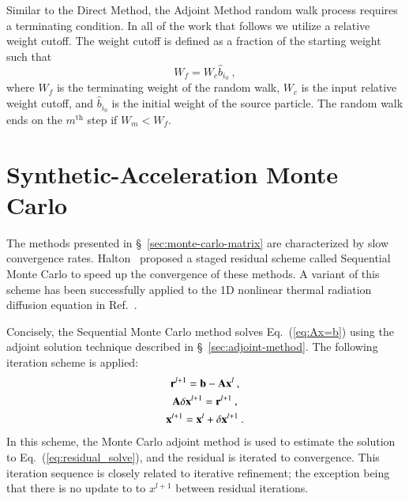 \documentclass[preprint,12pt]{elsarticle}
\newcommand{\vA}{\ensuremath{\ve{A}}}
\newcommand{\vb}{\ensuremath{\ve{b}}}
\newcommand{\vx}{\ensuremath{\ve{x}}}
\newcommand{\vr}{\ensuremath{\ve{r}}}
\begin{document}
Similar to the Direct Method, the Adjoint Method random walk process
requires a terminating condition.  In all of the work that follows we
utilize a relative weight cutoff.  The weight cutoff is defined as a
fraction of the starting weight such that
\begin{equation}
  W_f = W_c\hat{b}_{i_0}\:,
  \label{eq:weight_cutoff}
\end{equation}
where $W_f$ is the terminating weight of the random walk, $W_c$ is the
input relative weight cutoff, and $\hat{b}_{i_0}$ is the initial
weight of the source particle.  The random walk ends on the
$m^\text{th}$ step if $W_m < W_f$.

\section{Synthetic-Acceleration Monte Carlo}
\label{sec:iter-refin-monte}

The methods presented in \S~\ref{sec:monte-carlo-matrix} are
characterized by slow convergence rates.
Halton~\cite{halton_1962,halton_1994} proposed a staged residual
scheme called Sequential Monte Carlo to speed up the convergence of
these methods.  A variant of this scheme has been successfully applied
to the 1D nonlinear thermal radiation diffusion equation in
Ref.~\cite{evans_2003}.

Concisely, the Sequential Monte Carlo method solves
Eq.~(\ref{eq:Ax=b}) using the adjoint solution technique described in
\S~\ref{sec:adjoint-method}.  The following iteration scheme is
applied:
\begin{subequations}
  \begin{gather}
    \vr^{l+1} = \vb - \vA\vx^{l}\:, \\
    \vA\delta\vx^{l+1} = \vr^{l+1}\:, \label{eq:residual_solve}\\
    \vx^{l+1} = \vx^{l} + \delta\vx^{l+1}\:.
  \end{gather}
\end{subequations}
In this scheme, the Monte Carlo adjoint method is used to estimate the
solution to Eq.~(\ref{eq:residual_solve}), and the residual is
iterated to convergence.  This iteration sequence is closely related
to iterative refinement; the exception being that there is no update
to to $x^{l+1}$ between residual iterations.
\end{document}
